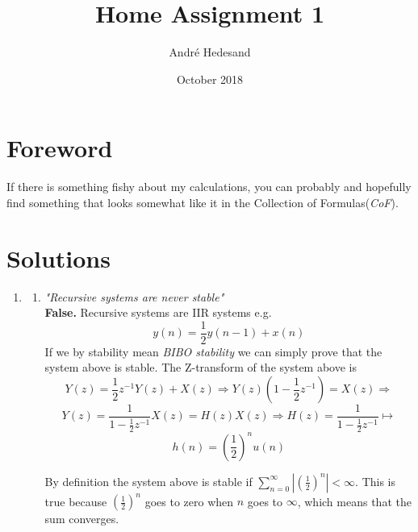 \documentclass{article}
\title{Home Assignment 1}
\author{André Hedesand}
\date{October 2018}
\begin{document}
\maketitle

\thispagestyle{fancy}
\section*{Foreword}
If there is something fishy about my calculations, you can probably and hopefully
find something that looks somewhat like it in the Collection of Formulas(\emph{CoF}).

\section*{Solutions}

\begin{enumerate}
    \item %
        \begin{enumerate}
            \item %
                \emph{"Recursive systems are never stable"}
                \\
                \textbf{False.} 
                Recursive systems are IIR systems e.g. 
                $$ y(n) = \frac{1}{2}y(n-1) + x(n) $$
                If we by stability mean \emph{BIBO stability} we can simply prove that the system above is stable. The Z-transform of the system above is
                $$ 
                    Y(z) = \frac{1}{2}z^{-1}Y(z) + X(z) \Rightarrow
                    Y(z)(1 - \frac{1}{2}z^{-1}) = X(z) \Rightarrow
                $$
                $$
                    Y(z) = \frac{1}{1 - \frac{1}{2}z^{-1}}X(z) = 
                    H(z) X(z) \Rightarrow 
                    H(z) = \frac{1}{1 - \frac{1}{2}z^{-1}} \longmapsto
                $$
                $$
                    h(n) = (\frac{1}{2})^{n} u(n)
                $$
                
                By definition the system above is stable if
                $ \sum_{n=0}^{\infty} |(\frac{1}{2})^{n}| < \infty $.
                This is true because $(\frac{1}{2})^{n}$ goes to zero when $n$
goes to $\infty$, which means that the sum converges.
            

\end{enumerate}
\end{enumerate}
\end{document}
